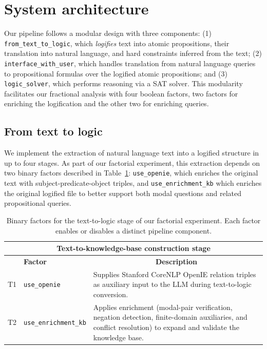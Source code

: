 \documentclass{article} %
\begin{document}
\section{System architecture}

Our pipeline follows a modular design with three components: (1) \texttt{from\_text\_to\_logic}, which \emph{logifies} text into atomic propositions, their translation into natural language, and hard constraints inferred from the text;  (2) \texttt{interface\_with\_user}, which handles translation from natural language queries to propositional formulas over the logified atomic propositions; and (3) \texttt{logic\_solver}, which performs reasoning via a SAT solver. 
This modularity facilitates our fractional analysis with four boolean factors, two factors for enriching the logification and the other two for enriching queries. 

\subsection{From text to logic}

We implement the extraction of natural language text into a logified structure in up to four stages.
As part of our factorial experiment, this extraction depends on two binary factors described in Table~\ref{table:frac_dsgn}: \texttt{use\_openie}, which enriches the original text with subject-predicate-object triples, and \texttt{use\_enrichment\_kb} which enriches the original logified file to better support both modal questions and related propositional queries. 

\begin{table}[t]
\begin{center}
\begin{tabular}{c|p{3.5cm}|p{8.5cm}}
\toprule
\multicolumn{3}{c}{\bf Text-to-knowledge-base construction stage} \\
\midrule
& \bf Factor & \multicolumn{1}{c}{\bf Description} \\
\midrule
T1 & \texttt{use\_openie} & Supplies Stanford CoreNLP OpenIE relation triples as auxiliary input to the LLM during text-to-logic conversion. \\ \hline
T2 & \texttt{use\_enrichment\_kb} & Applies enrichment (modal-pair verification, negation detection, finite-domain auxiliaries, and conflict resolution) to expand and validate the knowledge base. \\
\bottomrule
\end{tabular}
\end{center}
\caption{Binary factors for the text-to-logic stage of our factorial experiment. Each factor enables or disables a distinct pipeline component.}
\label{table:frac_dsgn}
\end{table}
\end{document}

